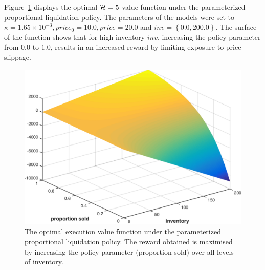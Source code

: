 %

Figure~\ref{fig:opt_execution} displays the optimal {\footnotesize$ \mathcal{H} = 5 $} value function under the parameterized proportional liquidation policy. The parameters of the models were set to {\footnotesize$ \kappa = 1.65 \times 10^{-3}, price_0 = 10.0, price = 20.0$} and {\footnotesize $inv = \left\lbrace 0.0, 200.0\right\rbrace$}. The surface of the function shows that for high inventory {\footnotesize $inv$}, increasing the policy parameter from {\footnotesize $ 0.0 $} to {\footnotesize $ 1.0 $}, results in an increased reward by limiting exposure to price slippage.

\begin{figure}[h!]
    \centering
    \includegraphics[width=0.8\linewidth, height=0.55\linewidth]{images/opt_execution_fraction}
    \caption{The optimal execution value function under the parameterized proportional liquidation policy. The reward obtained is maximised by increasing the policy parameter (proportion sold) over all levels of inventory.}
    \label{fig:opt_execution}            
\end{figure}

